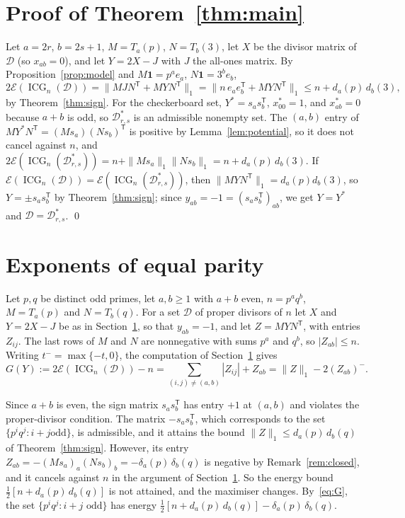 \documentclass[11pt]{article}
\theoremstyle{remark}
\newcommand{\ICG}{\operatorname{ICG}}
\newcommand{\E}{\mathcal E}
\begin{document}
\section{Proof of Theorem~\ref{thm:main}}\label{sec:proofmain}
Let $a=2r$, $b=2s+1$, $M=T_a(p)$, $N=T_b(3)$, let $X$ be the divisor matrix
of $\mathcal D$ (so $x_{ab}=0$), and let $Y=2X-J$ with $J$ the all-ones
matrix. By Proposition~\ref{prop:model} and $M\mathbf 1=p^ae_a$,
$N\mathbf1=3^be_b$,
\[
2\E(\ICG_n(\mathcal D))=\|MJN^{\mathsf T}+MYN^{\mathsf T}\|_1
=\|n\,e_ae_b^{\mathsf T}+MYN^{\mathsf T}\|_1\le n+d_a(p)\,d_b(3),
\]
by Theorem~\ref{thm:sign}. For the checkerboard set, $Y^*=s_as_b^{\mathsf T}$,
$x^*_{00}=1$, and $x^*_{ab}=0$ because $a+b$ is odd, so $\mathcal D^*_{r,s}$
is an admissible nonempty set. The $(a,b)$ entry of
$MY^*N^{\mathsf T}=(Ms_a)(Ns_b)^{\mathsf T}$ is positive by
Lemma~\ref{lem:potential}, so it does not cancel against $n$, and
$2\E(\ICG_n(\mathcal D^*_{r,s}))=n+\|Ms_a\|_1\|Ns_b\|_1=n+d_a(p)\,d_b(3)$. If
$\E(\ICG_n(\mathcal D))=\E(\ICG_n(\mathcal D^*_{r,s}))$, then
$\|MYN^{\mathsf T}\|_1=d_a(p)d_b(3)$, so $Y=\pm s_as_b^{\mathsf T}$ by
Theorem~\ref{thm:sign}; since $y_{ab}=-1=(s_as_b^{\mathsf T})_{ab}$, we get
$Y=Y^*$ and $\mathcal D=\mathcal D^*_{r,s}$. \qed

\section{Exponents of equal parity}\label{sec:equal}
Let $p,q$ be distinct odd primes, let $a,b\ge1$ with $a+b$ even, $n=p^aq^b$,
$M=T_a(p)$ and $N=T_b(q)$. For a set $\mathcal D$ of proper divisors of $n$
let $X$ and $Y=2X-J$ be as in Section~\ref{sec:proofmain}, so that
$y_{ab}=-1$, and let $Z=MYN^{\mathsf T}$, with entries $Z_{ij}$. The last rows
of $M$ and $N$ are nonnegative with sums $p^a$ and $q^b$, so $|Z_{ab}|\le n$.
Writing $t^-=\max\{-t,0\}$, the computation of Section~\ref{sec:proofmain}
gives
\begin{equation}\label{eq:G}
G(Y):=2\E(\ICG_n(\mathcal D))-n=\sum_{(i,j)\ne(a,b)}|Z_{ij}|+Z_{ab}
=\|Z\|_1-2(Z_{ab})^-.
\end{equation}

Since $a+b$ is even, the sign matrix $s_as_b^{\mathsf T}$ has entry $+1$ at
$(a,b)$ and violates the proper-divisor condition. The matrix
$-s_as_b^{\mathsf T}$, which corresponds to the set $\{p^iq^j: i+j\text{
odd}\}$, is admissible, and it attains the bound $\|Z\|_1\le d_a(p)\,d_b(q)$
of Theorem~\ref{thm:sign}. However, its entry
$Z_{ab}=-(Ms_a)_a(Ns_b)_b=-\delta_a(p)\,\delta_b(q)$ is negative by
Remark~\ref{rem:closed}, and it cancels against $n$ in the argument of
Section~\ref{sec:proofmain}. So the energy bound
$\tfrac12[n+d_a(p)\,d_b(q)]$ is not attained, and the maximiser changes.
By~\eqref{eq:G}, the set $\{p^iq^j: i+j\text{ odd}\}$ has energy
$\tfrac12[n+d_a(p)\,d_b(q)]-\delta_a(p)\,\delta_b(q)$.
\end{document}
